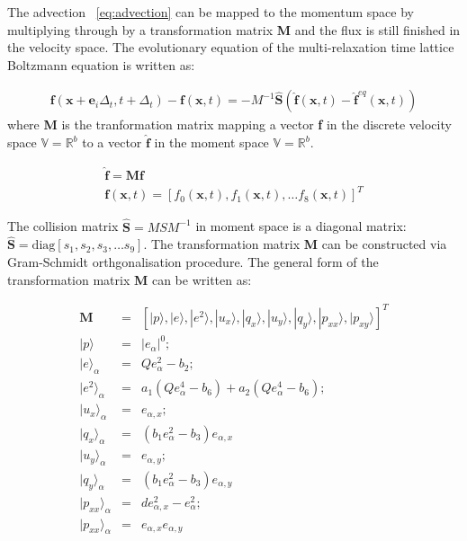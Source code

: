 \noindent The advection ~\cref{eq:advection} can be mapped to the momentum 
space by multiplying through by a transformation matrix \textbf{M} and the flux 
is still finished in the velocity space. The evolutionary equation of the 
multi-relaxation time lattice Boltzmann equation is written as:

\begin{gather}
\mathbf{f}(\mathbf{x}+\mathbf{e}_i\Delta_t, t+ 
\Delta_t)-\mathbf{f}(\mathbf{x},t)=-M^{-1}\hat{\mathbf{S}}(\hat{\mathbf{f}}
(\mathbf{x},t)-\hat{\mathbf{f}}^{eq}(\mathbf{x},t))
\end{gather}
\noindent where \textbf{M} is the tranformation matrix mapping a vector 
\textbf{f} in the discrete velocity space $\mathds{V}=\mathds{R}^b$ to a vector 
$\hat{\mathbf{f}}$ in the moment space $\mathds{V}=\mathds{R}^b$. 

\begin{gather}
\nonumber
\hat{\mathbf{f}}= \mathbf{M}\mathbf{f} \\ 
\nonumber
\mathbf{f}(\mathbf{x},t) =\left[f_0(\mathbf{x},t),f_1(\mathbf{x},t),\dots f_8(\mathbf{x},t)\right]^T
\end{gather}

The collision matrix $\hat{\mathbf{S}} = MSM^{-1}$ in moment space is a 
diagonal matrix: $\hat{\mathbf{S}} =\mbox{diag} \left[ s_1, s_2, s_3,\dots s_9  
\right]$. The transformation matrix \textbf{M} can be constructed via 
Gram-Schmidt orthgonalisation procedure. The general form of the transformation 
matrix \textbf{M} can be written as:

\begin{align}
\mathbf{M} & = & 
\left[|p\rangle,|e\rangle,|e^2\rangle,|u_x\rangle,|q_x\rangle,|u_y\rangle,
			|q_y\rangle,|p_{xx}\rangle,|p_{xy}\rangle\right]^T \\
|p\rangle & = & |\mathit{e}_{\alpha}|^0;\\
|e\rangle_{\alpha} & = & \mathit{Q}e_{\alpha}^2-b_2;\\
|e^2\rangle_{\alpha} & = & 	
		a_1(\mathit{Q}e_{\alpha}^4-b_6)+a_2(\mathit{Q}e_{\alpha}^4-b_6);\\
|u_x\rangle_{\alpha} & = & e_{\alpha,x}; \\
|q_x\rangle_{\alpha} & = & (\mathit{b}_1e_{\alpha}^2-b_3)e_{\alpha,x}\\
|u_y\rangle_{\alpha} & = & e_{\alpha,y}; \\
|q_y\rangle_{\alpha} & = & (\mathit{b}_1e_{\alpha}^2-b_3)e_{\alpha,y}\\
|p_{xx}\rangle_{\alpha} & = & \mathit{d}e_{\alpha,x}^2-e_{\alpha}^2; \\
|p_{xx}\rangle_{\alpha}  & = & e_{\alpha,x}e_{\alpha,y}
\end{align}


